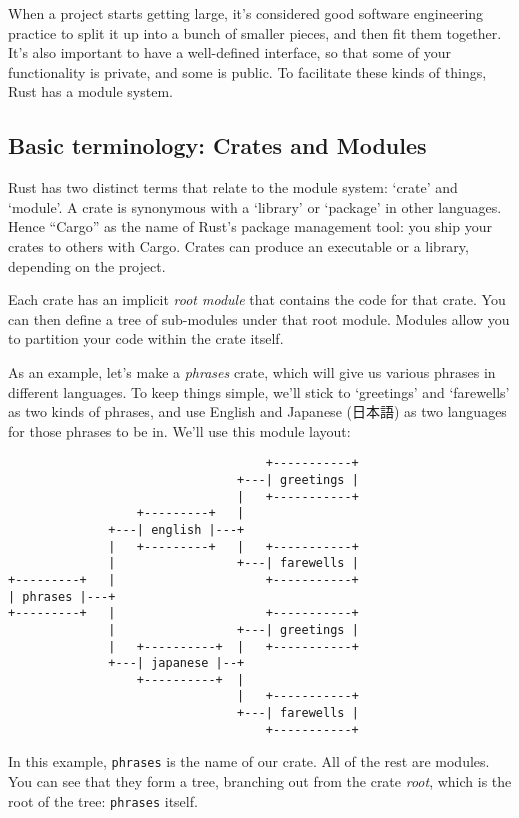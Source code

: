 \documentclass[a4paper,]{book}
\begin{document}
When a project starts getting large, it's considered good software
engineering practice to split it up into a bunch of smaller pieces, and
then fit them together. It's also important to have a well-defined
interface, so that some of your functionality is private, and some is
public. To facilitate these kinds of things, Rust has a module system.

\subsection{Basic terminology: Crates and
Modules}\label{basic-terminology-crates-and-modules}

Rust has two distinct terms that relate to the module system: `crate'
and `module'. A crate is synonymous with a `library' or `package' in
other languages. Hence ``Cargo'' as the name of Rust's package
management tool: you ship your crates to others with Cargo. Crates can
produce an executable or a library, depending on the project.

Each crate has an implicit \emph{root module} that contains the code for
that crate. You can then define a tree of sub-modules under that root
module. Modules allow you to partition your code within the crate
itself.

As an example, let's make a \emph{phrases} crate, which will give us
various phrases in different languages. To keep things simple, we'll
stick to `greetings' and `farewells' as two kinds of phrases, and use
English and Japanese (日本語) as two languages for those phrases to be
in. We'll use this module layout:

\begin{verbatim}
                                    +-----------+
                                +---| greetings |
                                |   +-----------+
                  +---------+   |
              +---| english |---+
              |   +---------+   |   +-----------+
              |                 +---| farewells |
+---------+   |                     +-----------+
| phrases |---+
+---------+   |                     +-----------+
              |                 +---| greetings |
              |   +----------+  |   +-----------+
              +---| japanese |--+
                  +----------+  |
                                |   +-----------+
                                +---| farewells |
                                    +-----------+
\end{verbatim}

In this example, \texttt{phrases} is the name of our crate. All of the
rest are modules. You can see that they form a tree, branching out from
the crate \emph{root}, which is the root of the tree: \texttt{phrases}
itself.
\end{document}
